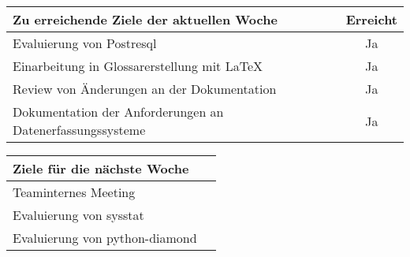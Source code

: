 \begin{tabularx}{\textwidth}{Xc}
    \arrayrulecolor{OliveGreen}
    \toprule
    {\bfseries Zu erreichende Ziele der aktuellen Woche} & {\bfseries Erreicht} \\
    \midrule[2pt]
    Evaluierung von Postresql                            &Ja                    \\
    \rowcolor{OliveGreen!15}
    Einarbeitung in Glossarerstellung mit \LaTeX{}       &Ja                    \\
    \rowcolor{White}
    Review von Änderungen an der Dokumentation           &Ja                    \\
    \rowcolor{OliveGreen!15}
    Dokumentation der Anforderungen an Datenerfassungssysteme  &Ja                    \\
    \bottomrule[2pt]
\end{tabularx}
%
\vspace{1cm}
%
\begin{tabularx}{\textwidth}{Xc}
    \arrayrulecolor{OliveGreen}
    \toprule
    {\bfseries Ziele für die nächste Woche}              &                      \\
    \midrule[2pt]
    Teaminternes Meeting                            &                      \\
    \rowcolor{OliveGreen!15}
    Evaluierung von sysstat                 &                      \\
    \rowcolor{White}
    Evaluierung von python-diamond  & \\
\end{tabularx}
